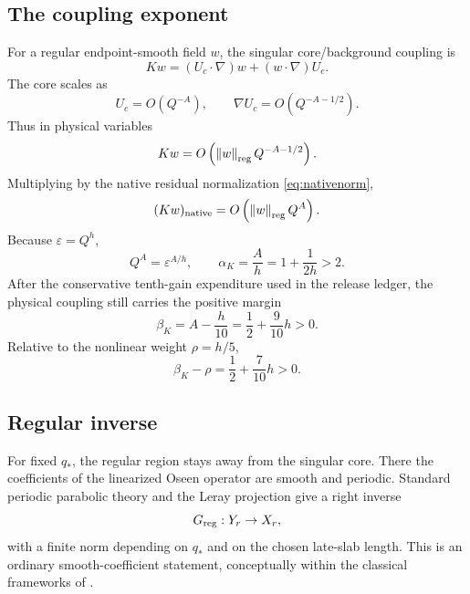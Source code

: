 \documentclass[11pt]{article}
\numberwithin{equation}{section}
\newcommand{\eps}{\varepsilon}
\newcommand{\norm}[1]{\left\lVert #1\right\rVert}
\begin{document}
\subsection{The coupling exponent}
For a regular endpoint-smooth field \(w\), the singular core/background coupling is
\begin{equation}
Kw=(U_c\cdot\nabla)w+(w\cdot\nabla)U_c.
\label{eq:K}
\end{equation}
The core scales as
\begin{equation}
U_c=O(Q^{-A}),
\qquad
\nabla U_c=O(Q^{-A-1/2}).
\label{eq:Ucscale}
\end{equation}
Thus in physical variables
\begin{equation}
Kw=O\left(\norm w_{\rm reg}Q^{-A-1/2}\right).
\label{eq:Kphys}
\end{equation}
Multiplying by the native residual normalization \eqref{eq:nativenorm},
\begin{equation}
(Kw)_{\rm native}=O\left(\norm w_{\rm reg}Q^A\right).
\label{eq:Knative}
\end{equation}
Because \(\eps=Q^h\),
\begin{equation}
Q^A=\eps^{A/h},
\qquad
\boxed{\alpha_K=\frac Ah=1+\frac1{2h}>2.}
\label{eq:alphaK}
\end{equation}
After the conservative tenth-gain expenditure used in the release ledger, the physical coupling still carries the positive margin
\begin{equation}
\beta_K=A-\frac h{10}=\frac12+\frac9{10}h>0.
\label{eq:betaK}
\end{equation}
Relative to the nonlinear weight \(\rho=h/5\),
\begin{equation}
\beta_K-\rho=\frac12+\frac7{10}h>0.
\label{eq:Kmargin}
\end{equation}

\subsection{Regular inverse}
For fixed \(q_*\), the regular region stays away from the singular core.  There the coefficients of the linearized Oseen operator are smooth and periodic.  Standard periodic parabolic theory and the Leray projection give a right inverse
\begin{equation}
G_{\rm reg}:Y_r\to X_r,
\label{eq:Greg}
\end{equation}
with a finite norm depending on \(q_*\) and on the chosen late-slab length.  This is an ordinary smooth-coefficient statement, conceptually within the classical frameworks of \cite{Temam1984,ConstantinFoias1988,Sohr2001,Galdi2011}.
\end{document}
